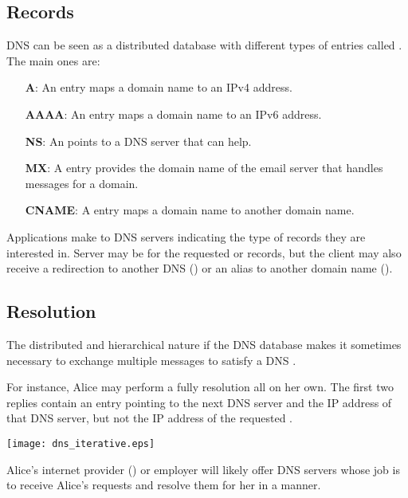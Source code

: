 \subsection{Records}

DNS can be seen as a distributed database with different types of entries
called . The main ones are:

\begin{itemize}
\item[\textbf{A}:] An  entry maps a domain name to an IPv4 address.
\item[\textbf{AAAA}:] An  entry maps a domain name to an IPv6 address.
\item[\textbf{NS}:] An  points to a DNS server that can help.
\item[\textbf{MX}:] A  entry provides the domain name of the email server 
  that handles messages for a domain.
\item[\textbf{CNAME}:] A  entry maps a domain name to another domain name.
\end{itemize}

Applications make  to DNS servers indicating the type 
of records they are interested in. Server  may be for
the requested  or  records, 
but the client may also receive a redirection to another DNS () 
or an alias to another domain name ().

\subsection{Resolution}

The distributed and hierarchical nature if the DNS database makes it 
sometimes necessary to exchange multiple messages to satisfy a DNS .
 
For instance, Alice may perform a fully  resolution all on her own.
The first two replies contain an  entry pointing to the next 
DNS server and the IP address of that DNS server, but not the IP address of the 
requested .

\begin{center}
\texttt{[image: dns\_iterative.eps]}
\end{center}

Alice's internet provider () or employer will likely offer DNS servers 
whose job is to receive Alice's requests and resolve them for her in a  
manner.

